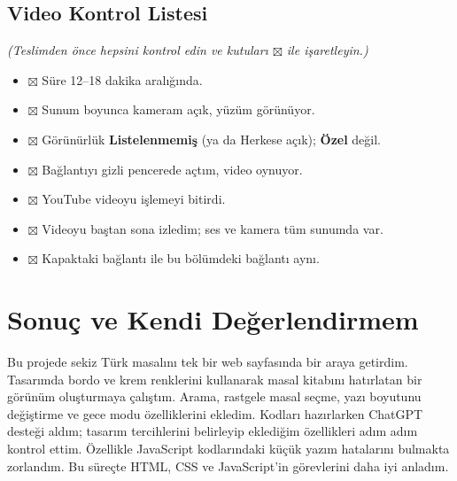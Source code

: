 \documentclass[12pt,a4paper]{article}
\newcommand{\aciklama}[1]{{\color{gray}\itshape (#1)}}
\begin{document}
\subsection{Video Kontrol Listesi}
\aciklama{Teslimden önce hepsini kontrol edin ve kutuları $\boxtimes$ ile işaretleyin.}
\begin{itemize}[label={}]
  \item $\boxtimes$ Süre 12--18 dakika aralığında.
  \item $\boxtimes$ Sunum boyunca kameram açık, yüzüm görünüyor.
  \item $\boxtimes$ Görünürlük \textbf{Listelenmemiş} (ya da Herkese açık); \textbf{Özel} değil.
  \item $\boxtimes$ Bağlantıyı gizli pencerede açtım, video oynuyor.
  \item $\boxtimes$ YouTube videoyu işlemeyi bitirdi.
  \item $\boxtimes$  Videoyu baştan sona izledim; ses ve kamera tüm sunumda var.
  \item $\boxtimes$ Kapaktaki bağlantı ile bu bölümdeki bağlantı aynı.
\end{itemize}

\section{Sonuç ve Kendi Değerlendirmem}

Bu projede sekiz Türk masalını tek bir web sayfasında bir araya getirdim. Tasarımda bordo ve krem renklerini kullanarak masal kitabını hatırlatan bir görünüm oluşturmaya çalıştım. Arama, rastgele masal seçme, yazı boyutunu değiştirme ve gece modu özelliklerini ekledim. Kodları hazırlarken ChatGPT desteği aldım; tasarım tercihlerini belirleyip eklediğim özellikleri adım adım kontrol ettim. Özellikle JavaScript kodlarındaki küçük yazım hatalarını bulmakta zorlandım. Bu süreçte HTML, CSS ve JavaScript’in görevlerini daha iyi anladım.

\end{document}
